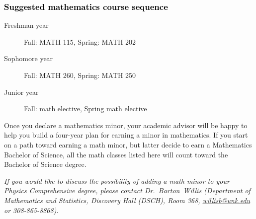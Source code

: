 \documentclass[10pt]{article}
\makeatletter
\newcommand{\contactbw}{\mbox{Dr.\ Barton Willis} (Department of Mathematics and Statistics,  Discovery Hall (DSCH), Room 368,
\href{mailto:willisb@unk.edu}{willisb@unk.edu} or 308-865-8868)}
\makeatother
\begin{document}
\subsubsection*{\textcolor{black}{Suggested mathematics course sequence}}

\begin{description}
   \item[\phantom{xxx} Freshman year] Fall: MATH 115, Spring:  MATH 202
      \item[\phantom{xxx} Sophomore year]  Fall: MATH 260,  Spring: MATH 250
     \item[\phantom{xxx} Junior year]  Fall: math elective, Spring math elective
 \end{description}
  \vspace{0.1in}

 \noindent Once you declare a mathematics minor, your academic advisor will be happy to help you build a four-year plan for earning a minor in mathematics.  If you start on a path toward earning a math minor, but latter decide to earn a  Mathematics Bachelor of Science, all the math classes listed here will count toward the Bachelor of Science degree.

   \vspace{0.1in}

\noindent \textcolor{unkblue}{\emph{If you would like to discuss the possibility of  adding a math minor to your Physics Comprehensive degree, please contact \contactbw.}}
\end{document}
